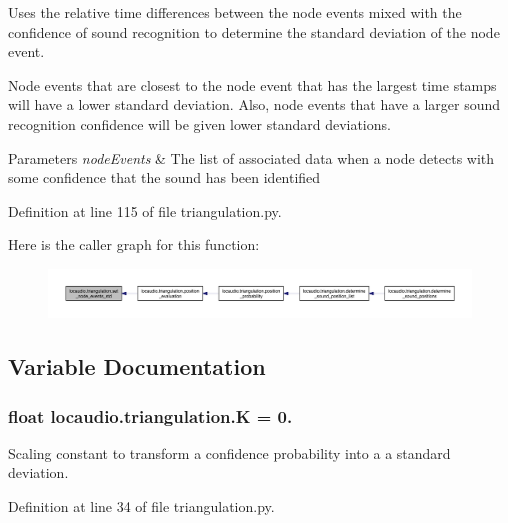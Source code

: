 Uses the relative time differences between the node events mixed with the confidence of sound recognition to determine the standard deviation of the node event. 

Node events that are closest to the node event that has the largest time stamps will have a lower standard deviation. Also, node events that have a larger sound recognition confidence will be given lower standard deviations.


\begin{DoxyParams}{Parameters}
{\em node\-Events} & The list of associated data when a node detects with some confidence that the sound has been identified \\
\hline
\end{DoxyParams}


Definition at line 115 of file triangulation.\-py.



Here is the caller graph for this function\-:\nopagebreak
\begin{figure}[H]
\begin{center}
\leavevmode
\includegraphics[width=350pt]{namespacelocaudio_1_1triangulation_ad44e1bed6beed7ee59cffc4c230f7144_icgraph}
\end{center}
\end{figure}




\subsection{Variable Documentation}
\hypertarget{namespacelocaudio_1_1triangulation_ac85bcbed961d15baa586ddc0192860bb}{
\subsubsection[{K}]{\setlength{\rightskip}{0pt plus 5cm}float locaudio.\-triangulation.\-K = 0.}}\label{namespacelocaudio_1_1triangulation_ac85bcbed961d15baa586ddc0192860bb}


Scaling constant to transform a confidence probability into a a standard deviation. 



Definition at line 34 of file triangulation.\-py.

